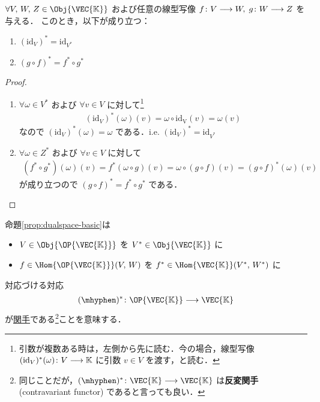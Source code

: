 \documentclass[geometry_main]{subfiles}
\begin{document}
\begin{myprop}[label=prop:dualspace-basic]{}
	$\forall V,\, W,\, Z \in \Obj{\VEC{\mathbb{K}}}$ および任意の線型写像 $f \colon V \longrightarrow W,\; g \colon W \longrightarrow Z$ を与える．
	このとき，以下が成り立つ：
	\begin{enumerate}
		\item $(\mathrm{id}_V)^* = \mathrm{id}_{V^*}$
		\item $(g \circ f)^* = f^* \circ g^*$
	\end{enumerate}
\end{myprop}

\begin{proof}
	\begin{enumerate}
		\item $\forall \omega \in V^*$ および $\forall v \in V$ に対して\footnote{引数が複数ある時は，左側から先に読む．今の場合，線型写像 $(\mathrm{id}_V)^* (\omega) \colon V \longrightarrow \mathbb{K}$ に引数 $v \in V$ を渡す，と読む．}
		\begin{align}
			(\mathrm{id}_V)^* (\omega)(v) = \omega \circ \mathrm{id_V} (v) = \omega(v)
		\end{align}
		なので $(\mathrm{id}_V)^*(\omega) = \omega$ である．i.e. $(\mathrm{id}_V)^* = \mathrm{id}_{V^*}$
		\item $\forall \omega \in Z^*$ および $\forall v \in V$ に対して
		\begin{align}
			(f^* \circ g^*)(\omega)(v) = f^* (\omega \circ g) (v) = \omega \circ (g  \circ f) (v) = (g\circ f)^* (\omega)(v)
		\end{align}
		が成り立つので $(g \circ f)^* = f^* \circ g^*$ である．
	\end{enumerate}
\end{proof}

命題\ref{prop:dualspace-basic}は
\begin{itemize}
	\item $V \in \Obj{\OP{\VEC{\mathbb{K}}}}$ を $V^* \in \Obj{\VEC{\mathbb{K}}}$ に
	\item $f \in \Hom{\OP{\VEC{\mathbb{K}}}}(V,\, W)$ を $f^* \in \Hom{\VEC{\mathbb{K}}}(V^*,\, W^*)$ に
\end{itemize}
対応づける対応
\begin{align}
	(\mhyphen)^* \colon \OP{\VEC{\mathbb{K}}} \lto \VEC{\mathbb{K}}
\end{align}
が\hyperref[def:functor]{関手}である\footnote{同じことだが，$(\mhyphen)^* \colon \VEC{\mathbb{K}} \lto \VEC{\mathbb{K}}$ は\textbf{反変関手} (contravariant functor) であると言っても良い．}ことを意味する．
\end{document}
